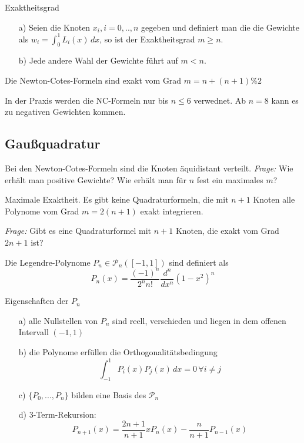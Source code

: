 \begin{theorem}[Satz I.3]
	Exaktheitsgrad
	
	\begin{itemize}
		\item[a)] Seien die Knoten $x_i, i = 0, .., n$ gegeben und definiert man die die Gewichte als $w_i = \int^1_0\!L_i(x) \,dx$, so ist der Exaktheitsgrad $m \ge n$.
		\item[b)] Jede andere Wahl der Gewichte führt auf $m < n$.
	\end{itemize}
\end{theorem}

\begin{theorem}[Satz I.4]
	Die Newton-Cotes-Formeln sind exakt vom Grad $m = n + (n+1)\%2$
\end{theorem}

\begin{remark}
In der Praxis werden die NC-Formeln nur bis $n\leq 6$ verwednet. Ab $n=8$ kann es zu negativen Gewichten kommen.
\end{remark}
	
	
\subsection{Gaußquadratur}

Bei den Newton-Cotes-Formeln sind die Knoten äquidistant verteilt. \emph{Frage:} Wie erhält man positive Gewichte? Wie erhält man für $n$ fest ein maximales $m$?

\begin{theorem}[Satz I.5] Maximale Exaktheit. Es gibt keine Quadraturformeln, die mit $n+1$ Knoten alle Polynome vom Grad $m = 2(n+1)$ exakt integrieren.\end{theorem} 	

\emph{Frage:} Gibt es eine Quadraturformel mit $n+1$ Knoten, die exakt vom Grad $2n+1$ ist?

\begin{definition}[Definition I.6] Die Legendre-Polynome $P_n \in \mathcal{P}_n ([-1,1])$ sind definiert als 
$$P_n(x) = \frac{(-1)^n}{2^n n!} \frac{d^n}{dx^n} (1-x^2)^n$$
\end{definition}

\begin{theorem}[Satz I.6] Eigenschaften der $P_n$
	\begin{itemize}
		\item[a)] alle Nullstellen von $P_n$ sind reell, verschieden und liegen in dem offenen Intervall $(-1, 1)$
		\item[b)] die Polynome erfüllen die Orthogonalitätsbedingung 
				$$\int_{-1}^1\!P_i(x) P_j(x)\,dx = 0\,\forall i \ne j$$
		\item[c)] $\{P_0, ..., P_n\}$ bilden eine Basis des $\mathcal{P}_n$
		\item[d)] 3-Term-Rekursion:
		$$P_{n+1}(x) = \frac{2n+1}{n+1} x P_n(x) - \frac{n}{n+1} P_{n-1}(x)$$
	\end{itemize}
\end{theorem}

